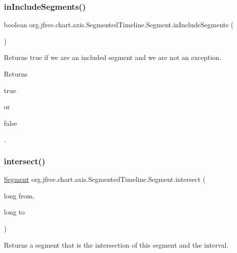 \subsubsection{\texorpdfstring{in\+Include\+Segments()}{inIncludeSegments()}}
{\footnotesize\ttfamily boolean org.\+jfree.\+chart.\+axis.\+Segmented\+Timeline.\+Segment.\+in\+Include\+Segments (\begin{DoxyParamCaption}{ }\end{DoxyParamCaption})}

Returns true if we are an included segment and we are not an exception.

\begin{DoxyReturn}{Returns}

\begin{DoxyCode}
\textcolor{keyword}{true} 
\end{DoxyCode}
 or
\begin{DoxyCode}
\textcolor{keyword}{false} 
\end{DoxyCode}
 . 
\end{DoxyReturn}
\mbox{\label{classorg_1_1jfree_1_1chart_1_1axis_1_1_segmented_timeline_1_1_segment_ad4a4cc6492423ddf6a5f35d314087882}} 
\subsubsection{\texorpdfstring{intersect()}{intersect()}}
{\footnotesize\ttfamily \mbox{\hyperlink{classorg_1_1jfree_1_1chart_1_1axis_1_1_segmented_timeline_1_1_segment}{Segment}} org.\+jfree.\+chart.\+axis.\+Segmented\+Timeline.\+Segment.\+intersect (\begin{DoxyParamCaption}\item[{long}]{from,  }\item[{long}]{to }\end{DoxyParamCaption})}

Returns a segment that is the intersection of this segment and the interval.


